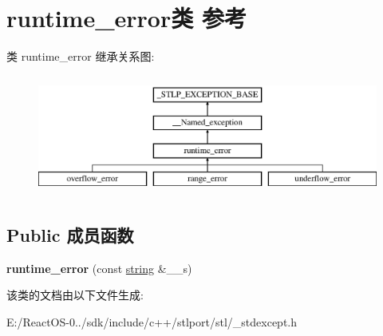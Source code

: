 \hypertarget{classruntime__error}{}\section{runtime\+\_\+error类 参考}
\label{classruntime__error}
类 runtime\+\_\+error 继承关系图\+:\begin{figure}[H]
\begin{center}
\leavevmode
\includegraphics[height=4.000000cm]{classruntime__error}
\end{center}
\end{figure}
\subsection*{Public 成员函数}
\begin{DoxyCompactItemize}
\item 
\mbox{\label{classruntime__error_a975b993ce92f4ab020b82742367da2c3}} 
{\bfseries runtime\+\_\+error} (const \hyperlink{structstring}{string} \&\+\_\+\+\_\+s)
\end{DoxyCompactItemize}


该类的文档由以下文件生成\+:\begin{DoxyCompactItemize}
\item 
E\+:/\+React\+O\+S-\/0../sdk/include/c++/stlport/stl/\+\_\+stdexcept.\+h\end{DoxyCompactItemize}
